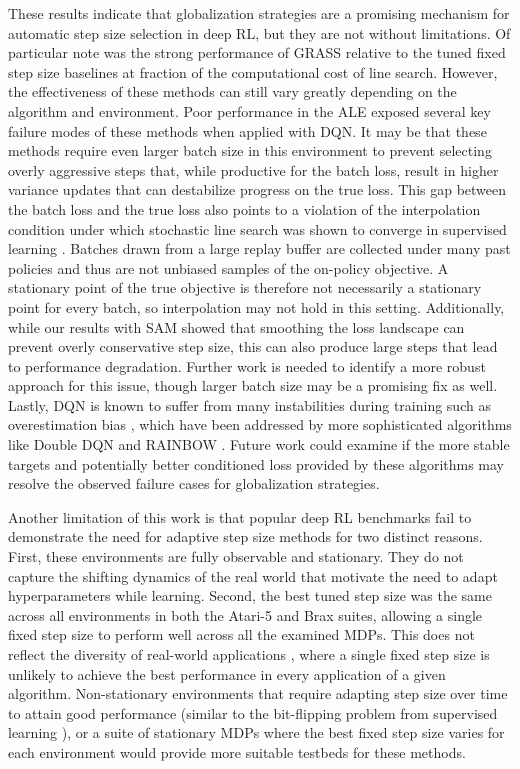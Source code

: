 These results indicate that globalization strategies are a promising mechanism for automatic step size selection in deep RL, but they are not without limitations. Of particular note was the strong performance of GRASS relative to the tuned fixed step size baselines at fraction of the computational cost of line search. However, the effectiveness of these methods can still vary greatly depending on the algorithm and environment. Poor performance in the ALE exposed several key failure modes of these methods when applied with DQN. It may be that these methods require even larger batch size in this environment to prevent selecting overly aggressive steps that, while productive for the batch loss, result in higher variance updates that can destabilize progress on the true loss. This gap between the batch loss and the true loss also points to a violation of the interpolation condition under which stochastic line search was shown to converge in supervised learning \cite{vaswani2019painless}. Batches drawn from a large replay buffer are collected under many past policies and thus are not unbiased samples of the on-policy objective. A stationary point of the true objective is therefore not necessarily a stationary point for every batch, so interpolation may not hold in this setting. Additionally, while our results with SAM showed that smoothing the loss landscape can prevent overly conservative step size, this can also produce large steps that lead to performance degradation. Further work is needed to identify a more robust approach for this issue, though larger batch size may be a promising fix as well. Lastly, DQN is known to suffer from many instabilities during training such as overestimation bias , which have been addressed by more sophisticated algorithms like Double DQN  and RAINBOW . Future work could examine if the more stable targets and potentially better conditioned loss provided by these algorithms may resolve the observed failure cases for globalization strategies.

Another limitation of this work is that popular deep RL benchmarks fail to demonstrate the need for adaptive step size methods for two distinct reasons. First, these environments are fully observable and stationary. They do not capture the shifting dynamics of the real world that motivate the need to adapt hyperparameters while learning. Second, the best tuned step size was the same across all environments in both the Atari-5 and Brax suites, allowing a single fixed step size to perform well across all the examined MDPs. This does not reflect the diversity of real-world applications , where a single fixed step size is unlikely to achieve the best performance in every application of a given algorithm. Non-stationary environments that require adapting step size over time to attain good performance (similar to the bit-flipping problem from supervised learning ), or a suite of stationary MDPs where the best fixed step size varies for each environment would provide more suitable testbeds for these methods. 

